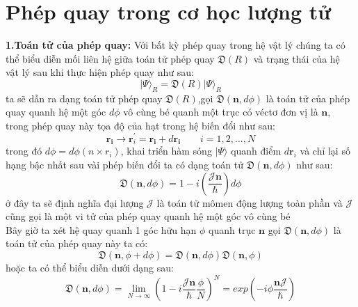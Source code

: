   \section{Phép quay trong cơ học lượng tử}
  \textbf{1.Toán tử của phép quay:} Với bất kỳ phép quay trong hệ vật lý chúng ta có thể biểu diễn mối liên hệ giữa toán tử phép quay $\mathfrak{D}(R)$ và trạng thái của hệ vật lý sau khi thực hiện phép quay như sau:
  \begin{equation}
  \vert \Psi\rangle_{R} = \mathfrak{D}(R) \vert \Psi\rangle_{R}
  \end{equation}  
  ta sẽ dẫn ra dạng toán tử phép quay $\mathfrak{D}(R)$,gọi $\mathfrak{D}(\mathbf{n},d\phi)$ là toán tử của phép quay quanh hệ một góc $d\phi$ vô cùng bé quanh một trục có véctơ đơn vị là $\mathbf{n}$, trong phép quay này tọa độ của hạt trong hệ biến đổi như sau:
  \begin{equation}
  \mathbf{r_i} \longrightarrow \mathbf{r}_i^{'} = \mathbf{r_i} +d\mathbf{r_i} \qquad i=1,2,\dots, N
  \end{equation} 
  trong đó $d\phi = d\phi\left(n\times r_i\right)$, khai triển hàm sóng $\vert \Psi\rangle$ quanh điểm $d\mathbf{r}_i$  và chỉ lại số hạng bậc nhất sau vài phép biến đổi ta có dạng toán tử $\mathfrak{D}(\mathbf{n},d\phi)$ như sau:
  \begin{equation}
  \mathfrak{D}(\mathbf{n},d\phi) = 1 -i\left(\frac{\mathcal{J}\mathbf{n}}{\hbar}\right)d\phi
  \end{equation}
  ở đây ta sẽ định nghĩa đại lượng $\mathcal{J}$ là toán tử mômen động lượng toàn phần và $\mathcal{J}$ cũng gọi là một vi tử của phép quay quanh hệ một góc vô cùng bé \\
  Bây giờ ta xét hệ quay quanh 1 góc hữu hạn $\phi$ quanh trục $\mathbf{n}$ gọi $\mathfrak{D}(\mathbf{n},d\phi)$  là toán tử của phép quay này ta có:
  \begin{equation}
  \mathfrak{D}(\mathbf{n},\phi + d\phi) =\mathfrak{D}(\mathbf{n},d\phi)\mathfrak{D}(\mathbf{n},\phi)
  \end{equation}
  hoặc ta có thể biểu diễn dưới dạng sau:
  \begin{equation}
  \mathfrak{D}(\mathbf{n},d\phi) = \lim_{N\longrightarrow\infty}\left(1 -i\frac{\mathcal{J}\mathbf{n}}{\hbar}\frac{\phi}{N}\right)^N = exp\left(-i\phi\frac{\mathbf{n}\mathcal{J}}{\hbar}\right)
  \end{equation}
